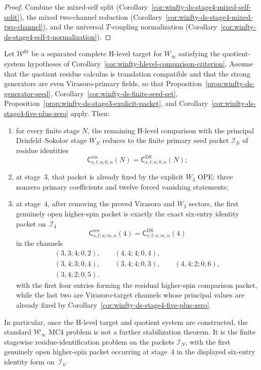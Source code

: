 \begin{proof}
Combine the mixed-self split (Corollary~\ref{cor:winfty-ds-stage4-mixed-self-split}), the mixed two-channel reduction (Corollary~\ref{cor:winfty-ds-stage4-mixed-two-channel}), and the universal $T$-coupling normalization (Corollary~\ref{cor:winfty-ds-stage4-self-t-normalization}).
\end{proof}

\begin{proposition}
\label{prop:winfty-mc4-frontier-package}
\ClaimStatusConditional
Let $\mathcal{W}^{\mathrm{ht}}$ be a separated complete H-level target
for $W_\infty$ satisfying the quotient-system hypotheses of
Corollary~\ref{cor:winfty-hlevel-comparison-criterion}. Assume
that the quotient residue calculus is translation compatible
and that the strong generators are even Virasoro-primary fields, so
that
Proposition~\ref{prop:winfty-ds-generator-seed},
Corollary~\ref{cor:winfty-ds-finite-seed-set},
Proposition~\ref{prop:winfty-ds-stage3-explicit-packet}, and
Corollary~\ref{cor:winfty-ds-stage4-five-plus-zero} apply. Then:
\begin{enumerate}
\item for every finite stage $N$, the remaining H-level comparison with
 the principal Drinfeld--Sokolov stage $W_N$ reduces to the finite
 primary seed packet $\mathcal{I}_N$ of residue identities
 \[
 \mathsf{C}^{\mathrm{res}}_{s,t;u;0,n}(N)
 =\mathsf{C}^{\mathrm{DS}}_{s,t;u;0,n}(N);
 \]
\item at stage~$3$, that packet is already fixed by the
 explicit $W_3$ OPE: three nonzero primary coefficients and twelve
 forced vanishing statements;
\item at stage~$4$, after removing the proved Virasoro and
 $W_3$ sectors, the first genuinely open higher-spin packet is exactly
 the exact six-entry identity packet on~$\mathcal{I}_4$
 \[
 \mathsf{C}^{\mathrm{res}}_{s,t;u;m,n}(4)
 =
 \mathsf{C}^{\mathrm{DS}}_{s,t;u;m,n}(4)
 \]
 in the channels
 \[
 \begin{gathered}
 (3,3;4;0,2),\qquad
 (4,4;4;0,4),\\
 (3,4;3;0,4),\qquad
 (3,4;4;0,3),\qquad
 (4,4;2;0,6),\\
 (3,4;2;0,5).
 \end{gathered}
 \]
 with the first four entries forming the residual higher-spin
 comparison packet, while the last two are Virasoro-target channels
 whose principal values are already fixed by
 Corollary~\ref{cor:winfty-ds-stage4-five-plus-zero}.
\end{enumerate}
In particular, once the H-level target and quotient system are
constructed, the standard $\mathcal{W}_\infty$ MC4 problem is not a
further stabilization theorem. It is the finite stagewise
residue-identification problem on the packets $\mathcal{I}_N$, with the
first genuinely open higher-spin packet occurring at stage~$4$ in the
displayed six-entry identity form on~$\mathcal{I}_4$.
\end{proposition}

